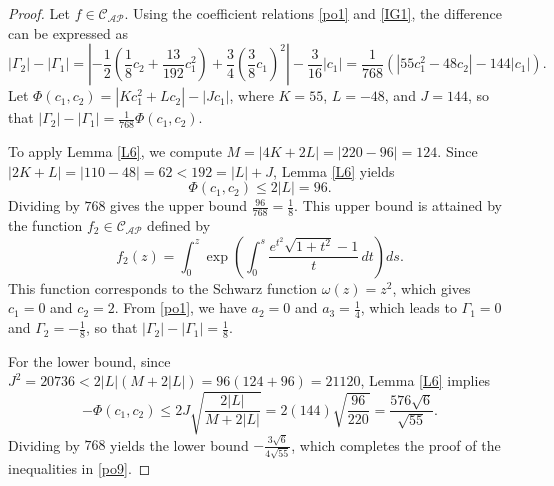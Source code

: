 \documentclass[10pt,a4paper]{amsart}
\numberwithin{equation}{section}
\begin{document}
\begin{proof}
Let $f \in \mathcal{C}_{\mathcal{AP}}$. Using the coefficient relations \eqref{po1} and \eqref{IG1}, the difference can be expressed as
\begin{equation}\label{po10}
|\Gamma_2|-|\Gamma_1| = \left| -\frac{1}{2} \left( \frac{1}{8} c_2+\frac{13}{192}c_1^2 \right) + \frac{3}{4} \left( \frac{3}{8} c_1 \right)^2 \right| - \frac{3}{16}|c_1| = \frac{1}{768} \left( |55c_1^2-48c_2|-144|c_1| \right).
\end{equation}
Let $\Phi(c_1,c_2) = |Kc_1^2+Lc_2|-|Jc_1|$, where $K=55$, $L=-48$, and $J=144$, so that $|\Gamma_2|-|\Gamma_1| = \frac{1}{768}\Phi(c_1,c_2)$.

To apply Lemma \ref{L6}, we compute $M = |4K+2L| = |220-96| = 124$. Since $|2K+L| = |110-48| = 62 < 192 = |L|+J$, Lemma \ref{L6} yields
\[
\Phi(c_1,c_2) \le 2|L| = 96.
\]
Dividing by $768$ gives the upper bound $\frac{96}{768} = \frac{1}{8}$. This upper bound is attained by the function $f_2 \in \mathcal{C}_{\mathcal{AP}}$ defined by
\begin{equation}\label{ext2}
f_2(z) = \int_0^z \exp\left( \int_0^s \frac{e^{t^2}\sqrt{1+t^2}-1}{t}\,dt \right)ds.
\end{equation}
This function corresponds to the Schwarz function $\omega(z)=z^2$, which gives $c_1=0$ and $c_2=2$. From \eqref{po1}, we have $a_2 = 0$ and $a_3 = \frac{1}{4}$, which leads to $\Gamma_1 = 0$ and $\Gamma_2 = -\frac{1}{8}$, so that $|\Gamma_2|-|\Gamma_1| = \frac{1}{8}$.

For the lower bound, since $J^2 = 20736 < 2|L|(M+2|L|) = 96(124+96) = 21120$, Lemma \ref{L6} implies
\[
-\Phi(c_1,c_2) \le 2J \sqrt{\frac{2|L|}{M+2|L|}} = 2(144)\sqrt{\frac{96}{220}} = \frac{576\sqrt{6}}{\sqrt{55}}.
\]
Dividing by $768$ yields the lower bound $-\frac{3\sqrt{6}}{4\sqrt{55}}$, which completes the proof of the inequalities in \eqref{po9}.


\end{proof}
\end{document}
